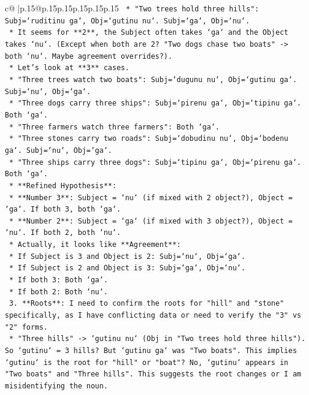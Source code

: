 \documentclass{article}
\begin{document}
{\begin{supertabular}{c@{$\;$}|p{.15\linewidth}@{}p{.15\linewidth}p{.15\linewidth}p{.15\linewidth}p{.15\linewidth}p{.15\linewidth}}
{{{\texttt{                *   "Two trees hold three hills": Subj=`ruditinu ga`, Obj=`gutinu nu`. Subj=`ga`, Obj=`nu`.} \\
\texttt{            *   It seems for **2**, the Subject often takes `ga` and the Object takes `nu`. (Except when both are 2? "Two dogs chase two boats" {-}> both `nu`. Maybe agreement overrides?).} \\
\texttt{            *   Let's look at **3** cases.} \\
\texttt{                *   "Three trees watch two boats": Subj=`dugunu nu`, Obj=`gutinu ga`. Subj=`nu`, Obj=`ga`.} \\
\texttt{                *   "Three dogs carry three ships": Subj=`pirenu ga`, Obj=`tipinu ga`. Both `ga`.} \\
\texttt{                *   "Three farmers watch three farmers": Both `ga`.} \\
\texttt{                *   "Three stones carry two roads": Subj=`dobudinu nu`, Obj=`bodenu ga`. Subj=`nu`, Obj=`ga`.} \\
\texttt{                *   "Three ships carry three dogs": Subj=`tipinu ga`, Obj=`pirenu ga`. Both `ga`.} \\
\texttt{            *   **Refined Hypothesis**:} \\
\texttt{                *   **Number 3**: Subject = `nu` (if mixed with 2 object?), Object = `ga`. If both 3, both `ga`.} \\
\texttt{                *   **Number 2**: Subject = `ga` (if mixed with 3 object?), Object = `nu`. If both 2, both `nu`.} \\
\texttt{                *   Actually, it looks like **Agreement**:} \\
\texttt{                    *   If Subject is 3 and Object is 2: Subj=`nu`, Obj=`ga`.} \\
\texttt{                    *   If Subject is 2 and Object is 3: Subj=`ga`, Obj=`nu`.} \\
\texttt{                    *   If both 3: Both `ga`.} \\
\texttt{                    *   If both 2: Both `nu`.} \\
\texttt{    3.  **Roots**: I need to confirm the roots for "hill" and "stone" specifically, as I have conflicting data or need to verify the "3" vs "2" forms.} \\
\texttt{        *   "Three hills" {-}> `gutinu nu` (Obj in "Two trees hold three hills"). So `gutinu` = 3 hills? But `gutinu ga` was "Two boats". This implies `gutinu` is the root for "hill" or "boat"? No, `gutinu` appears in "Two boats" and "Three hills". This suggests the root changes or I am misidentifying the noun.} \\
}}}
\end{supertabular}}
\end{document}

